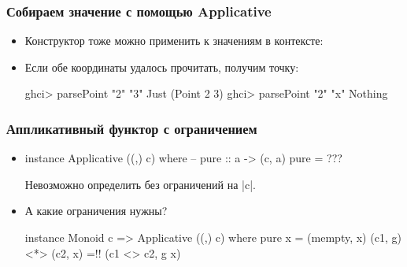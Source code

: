 \documentclass[11pt]{beamer}
\begin{document}
\begin{frame}[fragile]
  \frametitle{Собираем значение с помощью Applicative}
  \begin{itemize}
    \item Конструктор тоже можно применить к значениям в контексте:
          \pause
    \item Если обе координаты удалось прочитать, получим точку:
          \begin{haskell}
            ghci> parsePoint "2" "3"
            Just (Point 2 3)
            ghci> parsePoint "2" "x"
            Nothing
          \end{haskell}
  \end{itemize}
\end{frame}

\begin{frame}[fragile]
  \frametitle{Аппликативный функтор с ограничением}
  \begin{itemize}
    \item
          \begin{haskell}
            instance Applicative ((,) c) where 
              -- pure :: a -> (c, a)
              pure = ???
          \end{haskell}
          \pause Невозможно определить без ограничений на \haskinline|c|.
          \pause
    \item А какие ограничения нужны? \pause
          \begin{haskell}
            instance Monoid c => Applicative ((,) c) where
              pure x = (mempty, x)
              (c1, g) <*> (c2, x) =!\pause! (c1 <> c2, g x)
          \end{haskell}
  \end{itemize}
\end{frame}
\end{document}
